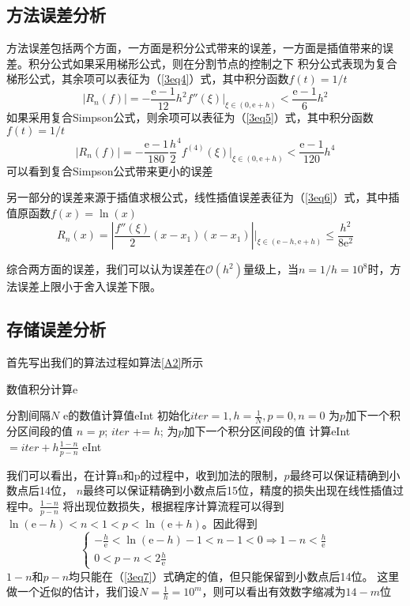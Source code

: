 \documentclass[onecolumn,compsoc]{IEEEtran}
\renewcommand{\|}{\Bigg |}
\newcommand{\e}{\mathrm{e}}
\begin{document}
\subsection{方法误差分析}
方法误差包括两个方面，一方面是积分公式带来的误差，一方面是插值带来的误差。积分公式如果采用梯形公式，则在分割节点的控制之下
积分公式表现为复合梯形公式，其余项可以表征为（\ref{3eq4}）式，其中积分函数$f(t) = 1 / t$
\begin{equation}\label{3eq4}
|R_n(f)| = -\frac{\e-1}{12}h^2f''(\xi)\|_{\xi\in(0,\e+h)} < \frac{\e-1}{6}h^2
\end{equation}
如果采用复合Simpson公式，则余项可以表征为（\ref{3eq5}）式，其中积分函数$f(t) = 1 / t$
\begin{equation}\label{3eq5}
|R_n(f)| = -\frac{\e-1}{180}\frac{h}{2}^4f^{(4)}(\xi)\|_{\xi\in(0,\e+h)} < \frac{\e-1}{120}h^4
\end{equation}
可以看到复合Simpson公式带来更小的误差

另一部分的误差来源于插值求根公式，线性插值误差表征为（\ref{3eq6}）式，其中插值原函数$f(x) = \ln(x)$
\begin{equation}\label{3eq6}
R_n(x) = |\frac{f''(\xi)}{2}(x-x_1)(x-x_1)|\|_{\xi \in (\e-h,\e+h)} \le \frac{h^2}{8\e^2}
\end{equation}

综合两方面的误差，我们可以认为误差在$\mathcal O (h^2)$量级上，当$n = 1/h = 10^8$时，方法误差上限小于舍入误差下限。
\subsection{存储误差分析}
首先写出我们的算法过程如算法\ref{A2}所示
\begin{algorithm}[h]\caption{数值积分计算e}\label{A2}
\begin{algorithmic}
\Require 分割间隔$N$
\Ensure e的数值计算值eInt
\State 初始化$iter = 1, h = \frac{1}{N}, p = 0, n = 0$
\State 为$p$加下一个积分区间段的值
\State $n$ = $p$;
\State $iter$ += $h$;
\State 为$p$加下一个积分区间段的值
\EndWhile
\State 计算eInt$ = iter + h\frac{1 - n}{p - n}$
\State \Return eInt
\end{algorithmic}\end{algorithm}
我们可以看出，在计算n和p的过程中，收到加法的限制，$p$最终可以保证精确到小数点后14位，
$n$最终可以保证精确到小数点后15位，精度的损失出现在线性插值过程中。$\frac{1 - n}{p - n}$
将出现位数损失，根据程序计算流程可以得到$\ln(\e-h) < n < 1 < p < \ln(\e+h)$。因此得到
\begin{equation}\label{3eq7}\begin{cases}
-\frac{h}{\e} < \ln(\e-h) -1 < n -1 < 0 \Rightarrow 1-n < \frac{h}{\e} \\
0 < p-n < 2\frac{h}{\e}
\end{cases}\end{equation}
$1-n$和$p-n$均只能在（\ref{3eq7}）式确定的值，但只能保留到小数点后14位。
这里做一个近似的估计，我们设$N = \frac{1}{h} = 10^m$，则可以看出有效数字缩减为$14 - m$位
\end{document}
